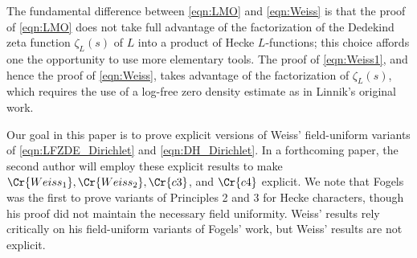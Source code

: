 \documentclass[12pt,psamsfonts]{amsart}
\theoremstyle{definition}
\theoremstyle{remark}
\numberwithin{equation}{section}
\theoremstyle{plain}
\theoremstyle{remark}
\renewcommand{\1}{ {\bf 1}}
\newcommand{\kp}{\mathfrak{p}}
\newcommand{\Q}{\mathbb{Q}}
\newcommand{\jesse}[1]{\color{blue} {\bf Jesse:} #1 \color{black}}
\begin{document}

The fundamental difference between \eqref{eqn:LMO} and \eqref{eqn:Weiss} is that the proof of \eqref{eqn:LMO} does not take full advantage of the factorization of the Dedekind zeta function $\zeta_L(s)$ of $L$ into a product of Hecke $L$-functions; this choice affords one the opportunity to use more elementary tools.  The proof of \eqref{eqn:Weiss1}, and hence the proof of \eqref{eqn:Weiss},  takes advantage of the factorization of $\zeta_L(s)$, which requires the use of a log-free zero density estimate as in Linnik's original work.

Our goal in this paper is to prove explicit versions of Weiss' field-uniform variants of \eqref{eqn:LFZDE_Dirichlet} and \eqref{eqn:DH_Dirichlet}.  In a forthcoming paper, the second author \cite{Zaman3} will employ these explicit results to make $\Cr{Weiss_1}, \Cr{Weiss_2}, \Cr{c3}$, and $\Cr{c4}$ explicit.  We note that Fogels \cite{Fogels} was the first to prove variants of Principles 2 and 3 for Hecke characters, though his proof did not maintain the necessary field uniformity.  Weiss' results rely critically on his field-uniform variants of Fogels' work, but Weiss' results are not explicit.
\end{document}
